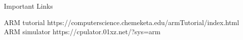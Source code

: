 


\begin{frame}{Important Links}

ARM tutorial https://computerscience.chemeketa.edu/armTutorial/index.html
ARM simulator https://cpulator.01xz.net/?sys=arm

\end{frame}
    